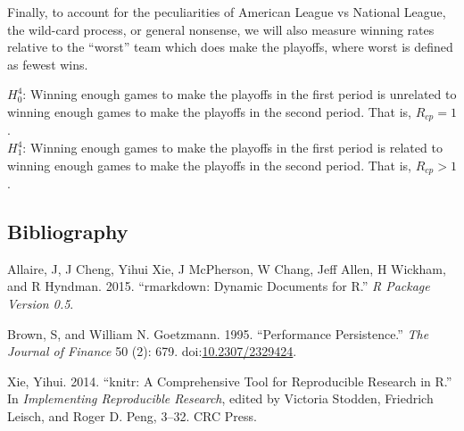 Finally, to account for the peculiarities of American League vs National
League, the wild-card process, or general nonsense, we will also measure
winning rates relative to the ``worst'' team which does make the
playoffs, where worst is defined as fewest wins.

\(H_{0}^4\): Winning enough games to make the playoffs in the first
period is unrelated to winning enough games to make the playoffs in the
second period. That is, \(R_{cp} = 1\).\\
\(H_{1}^4\): Winning enough games to make the playoffs in the first
period is related to winning enough games to make the playoffs in the
second period. That is, \(R_{cp} > 1\).

\subsection*{Bibliography}\label{bibliography}

\hypertarget{refs}{}
\hypertarget{ref-allaire2015}{}
Allaire, J, J Cheng, Yihui Xie, J McPherson, W Chang, Jeff Allen, H
Wickham, and R Hyndman. 2015. ``rmarkdown: Dynamic Documents for R.''
\emph{R Package Version 0.5}.

\hypertarget{ref-Brown1995}{}
Brown, S, and William N. Goetzmann. 1995. ``Performance Persistence.''
\emph{The Journal of Finance} 50 (2): 679.
doi:\href{https://doi.org/10.2307/2329424}{10.2307/2329424}.

\hypertarget{ref-Xie2014}{}
Xie, Yihui. 2014. ``knitr: A Comprehensive Tool for Reproducible
Research in R.'' In \emph{Implementing Reproducible Research}, edited by
Victoria Stodden, Friedrich Leisch, and Roger D. Peng, 3--32. CRC Press.

                                                                                                                                                                                                      \newpage
                                                                                                                                                                                                      \singlespacing 
                                                                                                                                                                                                                                                                                                                                                                                                                                                                                                                                                                                                                                                                                                                                                                                                                        
